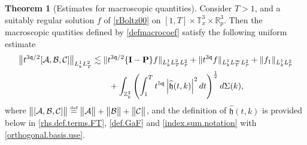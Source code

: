 \documentclass[reqno]{amsart}
\newcommand{\eqdef }{\overset{\mbox{\tiny{def}}}{=}}
\newcommand{\pv}{p}
\def\norm#1{\big\Vert#1\big\Vert}
\newcommand{\qq}{\mathfrak{q}}
\newcommand{\tTq}{t^{3\qq}}
\newcommand{\micro}{{\bf \{I- P\}}}
\theoremstyle{definition}
\newtheorem{theorem}{Theorem}
\numberwithin{equation}{section}
\numberwithin{theorem}{section}
\begin{document}
\begin{theorem}[Estimates for macroscopic quantities]\label{thmmacroscop}
Consider \(T>1\), and a suitably regular solution \(f\) of \eqref{rBoltz00} on \([1,T]\times \mathbb{T}^3_x\times \mathbb{R}^3_p\). Then the macroscopic quatities defined by \eqref{defmacrocoef} satisfy the following uniform estimate
\begin{align}\label{abcest.torus1}
\norm{t^{3\qq/2} [\mathcal{A},\mathcal{B},\mathcal{C}]}_{L^1_k L^2_T} &\lesssim
\Vert t^{3\qq/2}\micro f \Vert_{L^1_k L^2_T L^2_{\pv}} +\Vert \tTq f \Vert_{L^1_k L^\infty_T L^2_{\pv}} + \Vert f_1 \Vert_{L^1_k L^2_{\pv}} \\ \notag
&\qquad+ \int_{\mathbb{Z}^3_k} \left( \int^{T}_{1} t^{5\qq}\left| \widehat{\mathfrak{h}}(t,k)\right|^2
 dt \right)^{\frac12} d\Sigma (k),
\end{align}
where \(\norm{ [\mathcal{A},\mathcal{B},\mathcal{C}]}\eqdef\norm{ \mathcal{A}}+\norm{ \mathcal{B}}+\norm{ \mathcal{C}}\), and the definition of $ \widehat{\mathfrak{h}}(t,k)$ is provided below in \eqref{rhs.def.terms.FT}, \eqref{def.GaF}  and \eqref{index.sum.notation} with \eqref{orthogonal.basis.use}. 
\end{theorem}
\end{document}
